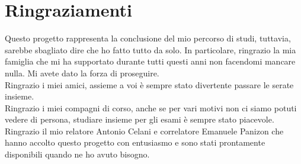 \chapter*{Ringraziamenti}

Questo progetto rappresenta la conclusione del mio percorso di studi, tuttavia, sarebbe sbagliato dire che ho fatto tutto da solo. In particolare, ringrazio la mia famiglia che mi ha supportato durante tutti questi anni non facendomi mancare nulla. Mi avete dato la forza di proseguire.\\
Ringrazio i miei amici, assieme a voi è sempre stato divertente passare le serate insieme.\\
Ringrazio i miei compagni di corso, anche se per vari motivi non ci siamo potuti vedere di persona, studiare insieme per gli esami è sempre stato piacevole.\\
Ringrazio il mio relatore Antonio Celani e correlatore Emanuele Panizon che hanno accolto questo progetto con entusiasmo e sono stati prontamente disponibili quando ne ho avuto bisogno.\\

